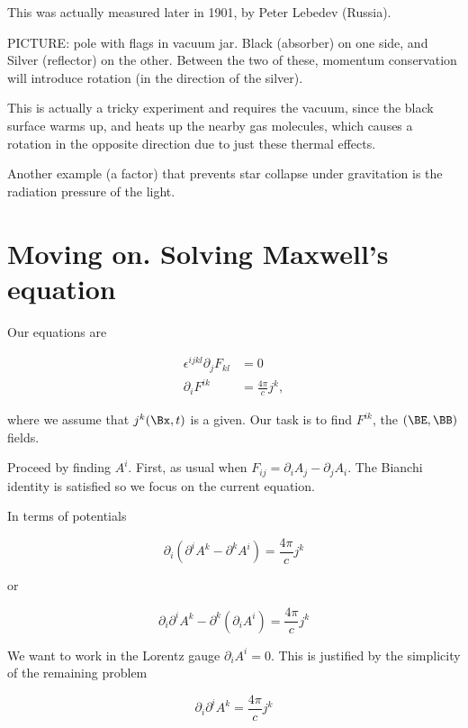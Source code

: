 This was actually measured later in 1901, by Peter Lebedev (Russia).

PICTURE: pole with flags in vacuum jar.  Black (absorber) on one side, and Silver (reflector) on the other.  Between the two of these, momentum conservation will introduce rotation (in the direction of the silver).

This is actually a tricky experiment and requires the vacuum, since the black surface warms up, and heats up the nearby gas molecules, which causes a rotation in the opposite direction due to just these thermal effects.

Another example (a factor) that prevents star collapse under gravitation is the radiation pressure of the light.

\section{Moving on.  Solving Maxwell's equation}

Our equations are

\begin{align}\label{eqn:relativisticElectrodynamicsL17:210}
\epsilon^{i j k l} \partial_j F_{k l} &= 0 \\
\partial_i F^{i k} &= \frac{4 \pi}{c} j^k,
\end{align}

where we assume that $j^k(\Bx, t)$ is a given.  Our task is to find $F^{i k}$, the $(\BE, \BB)$ fields.

Proceed by finding $A^i$.  First, as usual when $F_{i j} = \partial_i A_j - \partial_j A_i$.  The Bianchi identity is satisfied so we focus on the current equation.

In terms of potentials

\begin{equation}\label{eqn:relativisticElectrodynamicsL17:230}
\partial_i (\partial^i A^k - \partial^k A^i) = \frac{ 4 \pi}{c} j^k
\end{equation}

or

\begin{equation}\label{eqn:relativisticElectrodynamicsL17:250}
\partial_i \partial^i A^k - \partial^k (\partial_i A^i) = \frac{ 4 \pi}{c} j^k
\end{equation}

We want to work in the Lorentz gauge $\partial_i A^i = 0$.  This is justified by the simplicity of the remaining problem

\begin{equation}\label{eqn:relativisticElectrodynamicsL17:270}
\partial_i \partial^i A^k = \frac{4 \pi}{c} j^k
\end{equation}

